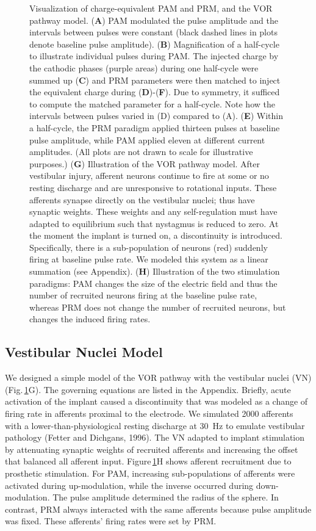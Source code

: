\begin{figure}[btp]
\caption[Charge-equivalent PAM, PRM and VOR model]{Visualization of charge-equivalent PAM and PRM, and the VOR pathway model. (\textbf{A}) PAM modulated the pulse amplitude and the intervals between pulses were constant (black dashed lines in plots denote baseline pulse amplitude). (\textbf{B}) Magnification of a half-cycle to illustrate individual pulses during PAM. The injected charge by the cathodic phases (purple areas) during one half-cycle were summed up (\textbf{C}) and PRM parameters were then matched to inject the equivalent charge during (\textbf{D})-(\textbf{F}). Due to symmetry, it sufficed to compute the matched parameter for a half-cycle. Note how the intervals between pulses varied in (D) compared to (A). (\textbf{E}) Within a half-cycle, the PRM paradigm applied thirteen pulses at baseline pulse amplitude, while PAM applied eleven at different current amplitudes. (All plots are not drawn to scale for illustrative purposes.) (\textbf{G}) Illustration of the VOR pathway model. After vestibular injury, afferent neurons continue to fire at some or no resting discharge and are unresponsive to rotational inputs. These afferents synapse directly on the vestibular nuclei; thus have synaptic weights. These weights and any self-regulation must have adapted to equilibrium such that nystagmus is reduced to zero. At the moment the implant is turned on, a discontinuity is introduced. Specifically, there is a sub-population of neurons (red) suddenly firing at baseline pulse rate. We modeled this system as a linear summation (see Appendix). (\textbf{H}) Illustration of the two stimulation paradigms: PAM changes the size of the electric field and thus the number of recruited neurons firing at the baseline pulse rate, whereas PRM does not change the number of recruited neurons, but changes the induced firing rates.}
\label{fig:pamprm:chargemodel}
\end{figure}

\subsection{Vestibular Nuclei Model}
We designed a simple model of the VOR pathway with the vestibular nuclei (VN) (Fig.\,\ref{fig:pamprm:chargemodel}G). The governing equations are listed in the Appendix. Briefly, acute activation of the implant caused a discontinuity that was modeled as a change of firing rate in afferents proximal to the electrode. We simulated 2000 afferents with a lower-than-physiological resting discharge at \SI{30}{\hertz} to emulate vestibular pathology (Fetter and Dichgans, 1996). The VN adapted to implant stimulation by attenuating synaptic weights of recruited afferents and increasing the offset that balanced all afferent input. 
Figure\,\ref{fig:pamprm:chargemodel}H shows afferent recruitment due to prosthetic stimulation. For PAM, increasing sub-populations of afferents were activated during up-modulation, while the inverse occurred during down-modulation. The pulse amplitude determined the radius of the sphere. In contrast, PRM always interacted with the same afferents because pulse amplitude was fixed. These afferents’ firing rates were set by PRM. 

